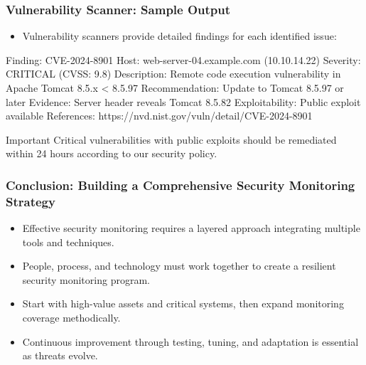 \documentclass{beamer}
\begin{document}
    \begin{frame}[fragile]
        \frametitle{Vulnerability Scanner: Sample Output}
        \begin{itemize}
        \item Vulnerability scanners provide detailed findings for each identified issue:
        \end{itemize}
        
        \tiny
        \begin{semiverbatim}
        Finding: CVE-2024-8901
        Host: web-server-04.example.com (10.10.14.22)
        Severity: CRITICAL (CVSS: 9.8)
        Description: Remote code execution vulnerability in 
                    Apache Tomcat 8.5.x < 8.5.97
        Recommendation: Update to Tomcat 8.5.97 or later
        Evidence: Server header reveals Tomcat 8.5.82
        Exploitability: Public exploit available
        References: https://nvd.nist.gov/vuln/detail/CVE-2024-8901
        \end{semiverbatim}
        
        \scriptsize
        \begin{alertblock}{Important}
        Critical vulnerabilities with public exploits should be remediated within 24 hours according to our security policy.
        \end{alertblock}
        \end{frame}
    
    \begin{frame}
    \frametitle{Conclusion: Building a Comprehensive Security Monitoring Strategy}
    \begin{itemize}
    \item Effective security monitoring requires a layered approach integrating multiple tools and techniques.
    \item People, process, and technology must work together to create a resilient security monitoring program.
    \item Start with high-value assets and critical systems, then expand monitoring coverage methodically.
    \item Continuous improvement through testing, tuning, and adaptation is essential as threats evolve.
    \end{itemize}
    
    \end{frame}
\end{document}
